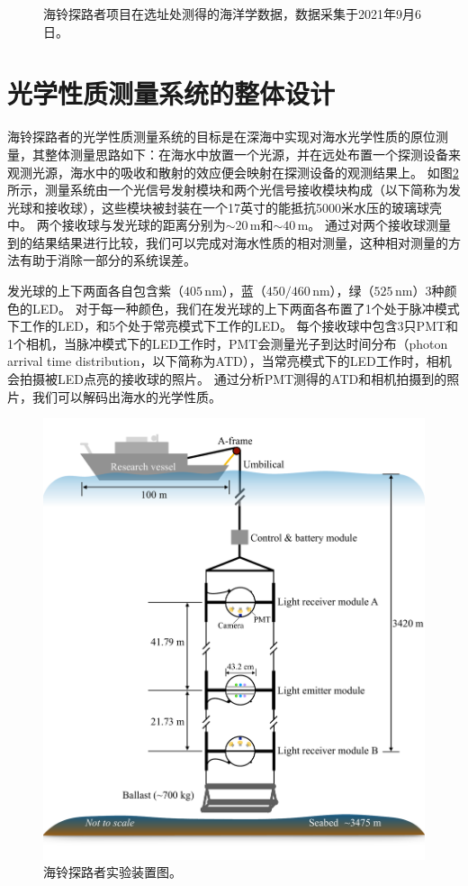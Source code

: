 \begin{figure}[!htb]
    \caption{海铃探路者项目在选址处测得的海洋学数据，数据采集于2021年9月6日。}
    \label{fig:pathfinder_ocean_condition}
\end{figure}


\section{光学性质测量系统的整体设计}

海铃探路者的光学性质测量系统的目标是在深海中实现对海水光学性质的原位测量，其整体测量思路如下：在海水中放置一个光源，并在远处布置一个探测设备来观测光源，海水中的吸收和散射的效应便会映射在探测设备的观测结果上。
如图\ref{fig:pathfinder_apparatus}所示，测量系统由一个光信号发射模块和两个光信号接收模块构成（以下简称为发光球和接收球），这些模块被封装在一个17英寸的能抵抗5000米水压的玻璃球壳中。
两个接收球与发光球的距离分别为$\sim20\,\mathrm{m}$和$\sim40\,\mathrm{m}$。
通过对两个接收球测量到的结果结果进行比较，我们可以完成对海水性质的相对测量，这种相对测量的方法有助于消除一部分的系统误差。

发光球的上下两面各自包含紫（$405\,\mathrm{nm}$），蓝（$450/460\,\mathrm{nm}$），绿（$525\,\mathrm{nm}$）3种颜色的LED。
对于每一种颜色，我们在发光球的上下两面各布置了1个处于脉冲模式下工作的LED，和5个处于常亮模式下工作的LED。
每个接收球中包含3只PMT和1个相机，当脉冲模式下的LED工作时，PMT会测量光子到达时间分布（photon arrival time distribution，以下简称为ATD），当常亮模式下的LED工作时，相机会拍摄被LED点亮的接收球的照片。
通过分析PMT测得的ATD和相机拍摄到的照片，我们可以解码出海水的光学性质。

\begin{figure}[htb]
    \centering
    \includegraphics[width=0.85\linewidth]{img/pathfinder_apparatus.pdf}
    \caption{海铃探路者实验装置图。}
    \label{fig:pathfinder_apparatus}
\end{figure}


